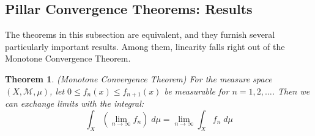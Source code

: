 \documentclass[12pt]{article}
\theoremstyle{plain}
\newtheorem{thm}{Theorem}[subsection]
\theoremstyle{definition}
\theoremstyle{remark}
\begin{document}
\subsection{Pillar Convergence Theorems: Results}

The theorems in this subsection are equivalent, and they furnish several particularly important results. Among them, linearity falls right out of the Monotone Convergence Theorem.

\begin{thm}
\emph{(Monotone Convergence Theorem)} For the measure space $(X,\mathscr{M},\mu)$, let $0\leq f_n(x)\leq f_{n+1}(x)$ be measurable for $n=1,2,\ldots$. Then we can exchange limits with the integral:
\[
    \int_X \left(\lim_{n\rightarrow\infty} f_n\right) 
    \; d\mu = 
    \lim_{n\rightarrow\infty} \int_X f_n \; d\mu
\]
\end{thm}
\end{document}
